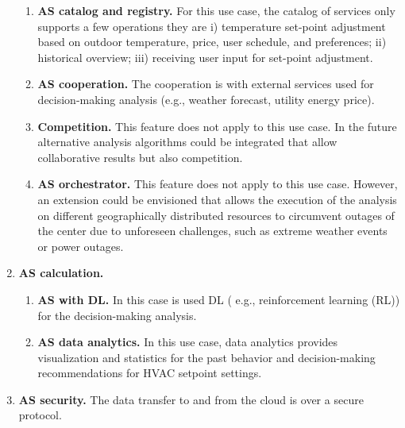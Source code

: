 \begin{enumerate}
\begin{enumerate}
  \item{\bf AS catalog and registry.} For this use case, the catalog of services only supports a few operations they are i) temperature set-point adjustment based on outdoor temperature, price, user schedule, and preferences; ii) historical overview; iii) receiving user input for set-point adjustment.
  \item{\bf AS cooperation.} The cooperation is with external services used for decision-making analysis (e.g., weather forecast, utility energy price).
  \item{\bf Competition.} This feature does not apply to this use case. In the future alternative analysis algorithms could be integrated that allow collaborative results but also competition.
  \item{\bf AS orchestrator.} This feature does not apply to this use case. However, an extension could be envisioned that allows the execution of the analysis on different geographically distributed resources to circumvent outages of the center due to unforeseen challenges, such as extreme weather events or power outages.
\end{enumerate}


\item{\bf AS calculation.}

\begin{enumerate}
  \item{\bf AS with DL.} In this case is used DL ( e.g., reinforcement learning (RL)) for the decision-making analysis.
  \item{\bf AS data analytics.} In this use case, data analytics provides visualization and statistics for the past behavior and decision-making recommendations for HVAC setpoint settings.
\end{enumerate}

\item{\bf AS security.} The data transfer to and from the cloud is over a secure protocol. 


\end{enumerate}


